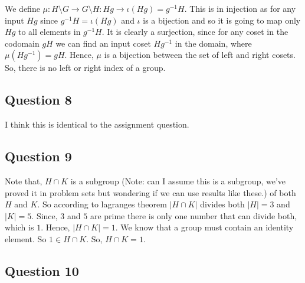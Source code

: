 We define \( \mu : H \setminus G \to G \setminus H: Hg \to \iota \left( Hg \right) = g^{-1}H\). This
is in injection as for any input \( Hg \) since \( g^{-1}H = \iota \left( Hg \right) \) and \( \iota  \) is a bijection and so
it is going to map only \( Hg \) to all elements in \( g^{-1}H \). It is clearly a surjection, since
for any coset in the codomain \(gH\) we can find an input coset \( Hg^{-1} \) in the domain, where
\( \mu \left( Hg^{-1} \right) = gH \). Hence, \( \mu  \) is a bijection between the set of left and right cosets.
So, there is no left or right index of a group.

\subsection{Question 8}
I think this is identical to the assignment question.

\subsection{Question 9}
Note that, \( H \cap K \) is a subgroup (Note: can I assume this is a subgroup, we've proved it in problem sets but wondering if we can use results like these.)
 of both \( H \) and \( K \). So according to lagranges theorem \( | H \cap K |  \) divides both \( | H | = 3 \) and \( | K | = 5 \). Since, \( 3 \) and \( 5 \) are prime
 there is only one number that can divide both, which is \( 1 \). Hence, \( | H \cap K | = 1 \). We know that a group must contain an identity element.
 So \( 1 \in H \cap K \). So, \( H \cap K = {1} \).

 \subsection{Question 10}

